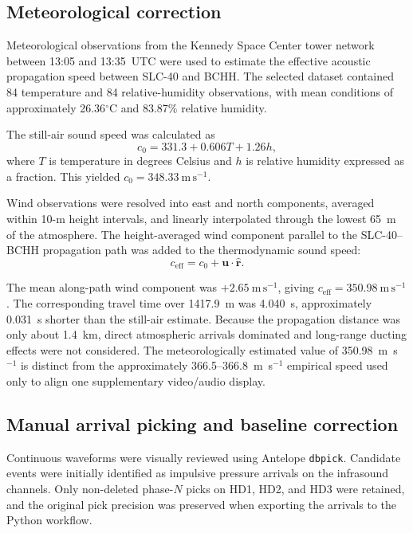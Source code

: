 \documentclass[]{seismica}
\begin{document}
\subsection{Meteorological correction}

Meteorological observations from the Kennedy Space Center tower network between
13:05 and 13:35~UTC were used to estimate the effective acoustic propagation
speed between SLC-40 and BCHH. The selected dataset contained 84 temperature
and 84 relative-humidity observations, with mean conditions of approximately
26.36$^\circ$C and 83.87\% relative humidity.

The still-air sound speed was calculated as
\begin{equation}
  c_0 = 331.3 + 0.606T + 1.26h,
  \label{eq:sound_speed}
\end{equation}
where $T$ is temperature in degrees Celsius and $h$ is relative humidity
expressed as a fraction. This yielded
$c_0=348.33~\mathrm{m\,s^{-1}}$.

Wind observations were resolved into east and north components, averaged
within 10-m height intervals, and linearly interpolated through the lowest
65~m of the atmosphere. The height-averaged wind component parallel to the
SLC-40--BCHH propagation path was added to the thermodynamic sound speed:
\begin{equation}
  c_{\mathrm{eff}} =
  c_0 + \mathbf{u}\cdot\hat{\mathbf{r}}.
  \label{eq:effective_speed}
\end{equation}

The mean along-path wind component was $+2.65~\mathrm{m\,s^{-1}}$, giving
$c_{\mathrm{eff}}=350.98~\mathrm{m\,s^{-1}}$. The corresponding travel time
over 1417.9~m was 4.040~s, approximately 0.031~s shorter than the still-air
estimate. Because the propagation distance was only about 1.4~km, direct
atmospheric arrivals dominated and long-range ducting effects were not
considered. The meteorologically estimated value of
350.98~m~s$^{-1}$ is distinct from the approximately
366.5--366.8~m~s$^{-1}$ empirical speed used only to align one supplementary
video/audio display.

\subsection{Manual arrival picking and baseline correction}

Continuous waveforms were visually reviewed using Antelope \texttt{dbpick}. Candidate events were initially identified as impulsive pressure arrivals on the infrasound channels. Only non-deleted phase-$N$ picks on HD1, HD2, and HD3 were retained, and the original pick precision was preserved when exporting the arrivals to the Python workflow.
\end{document}
